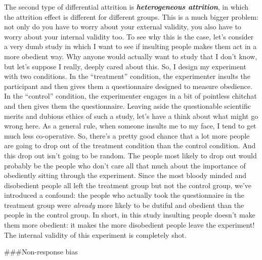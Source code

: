 \documentclass[]{book}
\begin{document}
The second type of differential attrition is \textbf{\emph{heterogeneous attrition}}, in which the attrition effect is different for different groups. This is a much bigger problem: not only do you have to worry about your external validity, you also have to worry about your internal validity too. To see why this is the case, let's consider a very dumb study in which I want to see if insulting people makes them act in a more obedient way. Why anyone would actually want to study that I don't know, but let's suppose I really, deeply cared about this. So, I design my experiment with two conditions. In the ``treatment'' condition, the experimenter insults the participant and then gives them a questionnaire designed to measure obedience. In the ``control'' condition, the experimenter engages in a bit of pointless chitchat and then gives them the questionnaire. Leaving aside the questionable scientific merits and dubious ethics of such a study, let's have a think about what might go wrong here. As a general rule, when someone insults me to my face, I tend to get much less co-operative. So, there's a pretty good chance that a lot more people are going to drop out of the treatment condition than the control condition. And this drop out isn't going to be random. The people most likely to drop out would probably be the people who don't care all that much about the importance of obediently sitting through the experiment. Since the most bloody minded and disobedient people all left the treatment group but not the control group, we've introduced a confound: the people who actually took the questionnaire in the treatment group were \emph{already} more likely to be dutiful and obedient than the people in the control group. In short, in this study insulting people doesn't make them more obedient: it makes the more disobedient people leave the experiment! The internal validity of this experiment is completely shot.

\#\#\#Non-response bias
\end{document}
